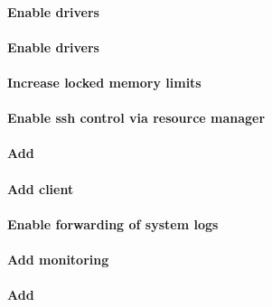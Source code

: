 \documentclass[letterpaper]{article}
\begin{document}
\paragraph{Enable \InfiniBand{} drivers}


\paragraph{Enable \OmniPath{} drivers}


\paragraph{Increase locked memory limits}


\paragraph{Enable ssh control via resource manager} 


\paragraph{Add \beegfs{}} \label{sec:add_beegfs}


\paragraph{Add \Lustre{} client} \label{sec:lustre_client}

\vspace*{0.25cm}



\paragraph{Enable forwarding of system logs} \label{sec:add_syslog}


\paragraph{Add \Nagios{} monitoring} \label{sec:add_nagios}


\paragraph{Add \clustershell{}}

\end{document}
